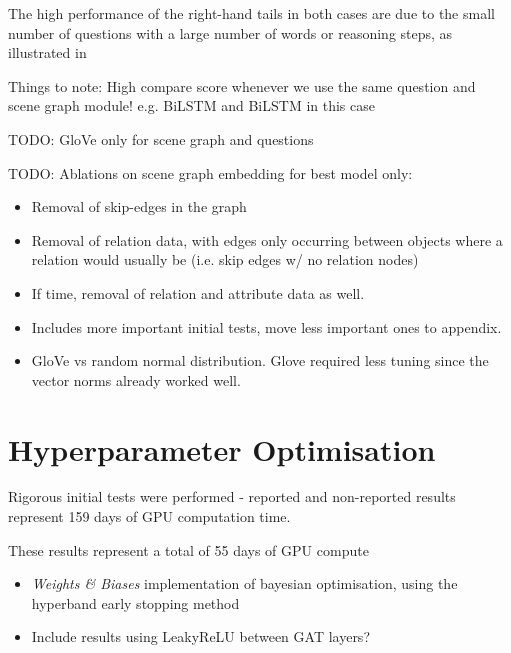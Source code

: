 The high performance of the right-hand tails in both cases are due to the small number of questions with a large number of words or reasoning steps, as illustrated in \figureautorefname{ \ref{fig:test_reasoning_step_and_question_length_distribution}}


{\color{red}Things to note: High compare score whenever we use the same question and scene graph module! e.g. BiLSTM and BiLSTM in this case}

{\color{red}TODO: GloVe only for scene graph and questions}

{\color{red}TODO: Ablations on scene graph embedding for best model only:
\begin{itemize}
    \item Removal of skip-edges in the graph
    \item Removal of relation data, with edges only occurring between objects where a relation would usually be (i.e. skip edges w/ no relation nodes)
    \item If time, removal of relation and attribute data as well.
\end{itemize}}

\begin{itemize}
    \item Includes more important initial tests, move less important ones to appendix.
\end{itemize}

\begin{itemize}
    \item GloVe vs random normal distribution. Glove required less tuning since the vector norms already worked well.
\end{itemize}

\section{Hyperparameter Optimisation}
\label{sec:hyperparameter_optimisation}

Rigorous initial tests were performed - reported and non-reported results represent 159 days of GPU computation time.

These results represent a total of 55 days of GPU compute

{\color{red}
  \begin{itemize}
    \item \textit{Weights \& Biases} \cite{wandb} implementation of bayesian optimisation, using the hyperband early stopping method
    \item Include results using LeakyReLU between GAT layers?
  \end{itemize}
}



